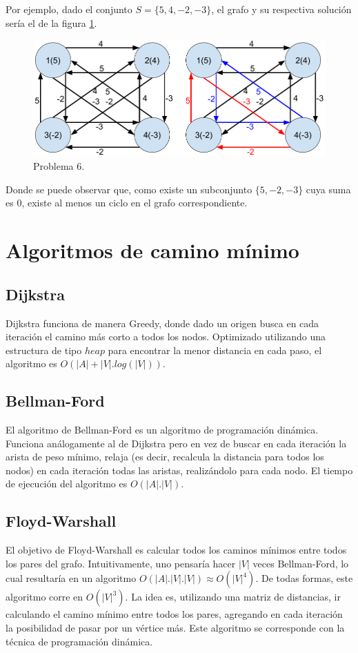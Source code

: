 \documentclass[a4paper,10pt]{article}
\begin{document}
	Por ejemplo, dado el conjunto $S = \{5, 4, -2, -3\}$, el grafo y su respectiva solución sería el de la figura \ref{fig:punto-6}.

	\begin{figure}[!htb]
		\centering
		\includegraphics[scale=0.4]{images/grafo-6.png}
		\caption{Problema 6.}
		\label{fig:punto-6}
	\end{figure}

	Donde se puede observar que, como existe un subconjunto $\{5, -2, -3\}$ cuya suma es 0, existe al menos un ciclo en el grafo correspondiente.

\section{Algoritmos de camino mínimo}
\subsection{Dijkstra}
	Dijkstra funciona de manera Greedy, donde dado un origen busca en cada iteración el camino más corto a todos los nodos. Optimizado utilizando una estructura de tipo $heap$ para encontrar la menor distancia en cada paso, el algoritmo es $O(|A|+|V|.log(|V|))$.

\subsection{Bellman-Ford}
	El algoritmo de Bellman-Ford es un algoritmo de programación dinámica. Funciona análogamente al de Dijkstra pero en vez de buscar en cada iteración la arista de peso mínimo, relaja (es decir, recalcula la distancia para todos los nodos) en cada iteración todas las aristas, realizándolo para cada nodo. El tiempo de ejecución del algoritmo es $O(|A|.|V|)$.

\subsection{Floyd-Warshall}
	El objetivo de Floyd-Warshall es calcular todos los caminos mínimos entre todos los pares del grafo. Intuitivamente, uno pensaría hacer $|V|$ veces Bellman-Ford, lo cual resultaría en un algoritmo $O(|A|.|V|.|V|) \approx O(|V|^4)$. De todas formas, este algoritmo corre en $O(|V|^3)$. La idea es, utilizando una matriz de distancias, ir calculando el camino mínimo entre todos los pares, agregando en cada iteración la posibilidad de pasar por un vértice más. Este algoritmo se corresponde con la técnica de programación dinámica.
\end{document}
